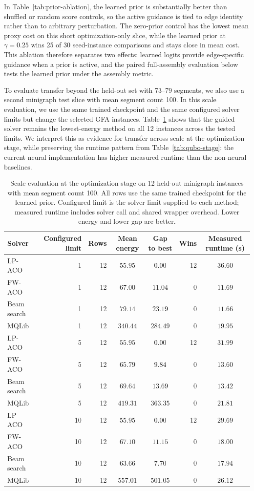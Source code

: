 \documentclass[11pt]{article}
\begin{document}
In Table~\ref{tab:prior-ablation}, the learned prior is substantially better than shuffled or random score controls, so the active guidance is tied to edge identity rather than to arbitrary perturbation. The zero-prior control has the lowest mean proxy cost on this short optimization-only slice, while the learned prior at $\gamma=0.25$ wins 25 of 30 seed-instance comparisons and stays close in mean cost. This ablation therefore separates two effects: learned logits provide edge-specific guidance when a prior is active, and the paired full-assembly evaluation below tests the learned prior under the assembly metric.

To evaluate transfer beyond the held-out set with 73--79 segments, we also use a second minigraph test slice with mean segment count 100. In this scale evaluation, we use the same trained checkpoint and the same configured solver limits but change the selected GFA instances. Table~\ref{tab:qubo-scale} shows that the guided solver remains the lowest-energy method on all 12 instances across the tested limits. We interpret this as evidence for transfer across scale at the optimization stage, while preserving the runtime pattern from Table~\ref{tab:qubo-stage}: the current neural implementation has higher measured runtime than the non-neural baselines.

\begin{table}[t]
\centering
\scriptsize
\caption{Scale evaluation at the optimization stage on 12 held-out minigraph instances with mean segment count 100. All rows use the same trained checkpoint for the learned prior. Configured limit is the solver limit supplied to each method; measured runtime includes solver call and shared wrapper overhead. Lower energy and lower gap are better.}
\label{tab:qubo-scale}
\begin{tabular}{lrrccrc}
\hline
Solver & Configured limit & Rows & Mean energy & Gap to best & Wins & Measured runtime (s) \\
\hline
LP-ACO & 1 & 12 & $55.95$ & $0.00$ & 12 & $36.60$ \\
FW-ACO & 1 & 12 & $67.00$ & $11.04$ & 0 & $11.69$ \\
Beam search & 1 & 12 & $79.14$ & $23.19$ & 0 & $11.66$ \\
MQLib & 1 & 12 & $340.44$ & $284.49$ & 0 & $19.95$ \\
\hline
LP-ACO & 5 & 12 & $55.95$ & $0.00$ & 12 & $31.99$ \\
FW-ACO & 5 & 12 & $65.79$ & $9.84$ & 0 & $13.60$ \\
Beam search & 5 & 12 & $69.64$ & $13.69$ & 0 & $13.42$ \\
MQLib & 5 & 12 & $419.31$ & $363.35$ & 0 & $21.81$ \\
\hline
LP-ACO & 10 & 12 & $55.95$ & $0.00$ & 12 & $29.69$ \\
FW-ACO & 10 & 12 & $67.10$ & $11.15$ & 0 & $18.00$ \\
Beam search & 10 & 12 & $63.66$ & $7.70$ & 0 & $17.94$ \\
MQLib & 10 & 12 & $557.01$ & $501.05$ & 0 & $26.12$ \\
\hline
\end{tabular}
\end{table}
\end{document}
